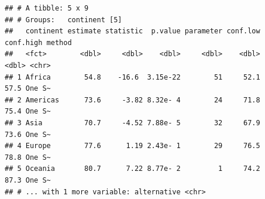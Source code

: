 \documentclass[12pt,]{krantz}
\makeatletter
\newenvironment{Shaded}{\begin{snugshade}}{\end{snugshade}}
\newcommand{\CommentTok}[1]{\textcolor[rgb]{0.56,0.35,0.01}{\textit{#1}}}
\newcommand{\DataTypeTok}[1]{\textcolor[rgb]{0.13,0.29,0.53}{#1}}
\newcommand{\DecValTok}[1]{\textcolor[rgb]{0.00,0.00,0.81}{#1}}
\newcommand{\KeywordTok}[1]{\textcolor[rgb]{0.13,0.29,0.53}{\textbf{#1}}}
\newcommand{\NormalTok}[1]{#1}
\newcommand{\OperatorTok}[1]{\textcolor[rgb]{0.81,0.36,0.00}{\textbf{#1}}}
\newcommand{\StringTok}[1]{\textcolor[rgb]{0.31,0.60,0.02}{#1}}
\newenvironment{kframe}{%
\medskip{}
\setlength{\fboxsep}{.8em}
 \def\at@end@of@kframe{}%
 \ifinner\ifhmode%
  \def\at@end@of@kframe{\end{minipage}}%
  \begin{minipage}{\columnwidth}%
 \fi\fi%
 \def\FrameCommand##1{\hskip\@totalleftmargin \hskip-\fboxsep
 \colorbox{shadecolor}{##1}\hskip-\fboxsep
     \hskip-\linewidth \hskip-\@totalleftmargin \hskip\columnwidth}%
 \MakeFramed {\advance\hsize-\width
   \@totalleftmargin\z@ \linewidth\hsize
   \@setminipage}}%
 {\par\unskip\endMakeFramed%
 \at@end@of@kframe}
\renewenvironment{Shaded}{\begin{kframe}}{\end{kframe}}
\theoremstyle{definition}
\theoremstyle{definition}
\theoremstyle{definition}
\theoremstyle{remark}
\makeatother
\begin{document}
\begin{Shaded}
\end{Shaded}

\begin{verbatim}
## # A tibble: 5 x 9
## # Groups:   continent [5]
##   continent estimate statistic  p.value parameter conf.low conf.high method
##   <fct>        <dbl>     <dbl>    <dbl>     <dbl>    <dbl>     <dbl> <chr> 
## 1 Africa        54.8    -16.6  3.15e-22        51     52.1      57.5 One S~
## 2 Americas      73.6     -3.82 8.32e- 4        24     71.8      75.4 One S~
## 3 Asia          70.7     -4.52 7.88e- 5        32     67.9      73.6 One S~
## 4 Europe        77.6      1.19 2.43e- 1        29     76.5      78.8 One S~
## 5 Oceania       80.7      7.22 8.77e- 2         1     74.2      87.3 One S~
## # ... with 1 more variable: alternative <chr>
\end{verbatim}

\begin{Shaded}
\end{Shaded}
\end{document}
